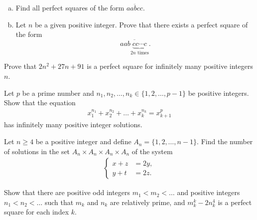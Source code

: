\documentclass[problems.tex]{subfile}
\begin{document}
	\begin{problem}
		$ $
		\begin{enumerate}[(a)]
			\item Find all perfect squares of the form $\overline{aabcc}$.
			\item Let $n$ be a given positive integer. Prove that there exists a perfect square of the form $$\overline{aab\underbrace{cc\cdots c}_{2n\text{ times}}}.$$
		\end{enumerate}
	\end{problem}



	\begin{problem}
		Prove that $2n^2 + 27n + 91$ is a perfect square for infinitely many positive integers $n$.
	\end{problem}


	\begin{problem}
		Let $p$ be a prime number and $n_1, n_2, \dots, n_k \in \{1, 2, \dots, p -1\}$ be positive integers. Show that the equation
		\begin{align*}
			x_1^{n_1} + x_2^{n_2} + \dots + x_k^{n_k} = x_{k+1}^p
		\end{align*}
		has infinitely many positive integer solutions.
	\end{problem}


	\begin{problem}
		Let $n \geq 4$ be a positive integer and define $A_n = \{1, 2, \dots, n -1\}$. Find the number of solutions in the set $A_n \times  A_n \times A_n \times A_n$ of the system
		\begin{align*}
			\begin{cases}
				x+z &= 2y,\\
				y+t &= 2z.
			\end{cases}
		\end{align*}
	\end{problem}



	\begin{problem}
		Show that there are positive odd integers $m_1 < m_2 < \dots  $ and positive integers $n_1 < n_2 < \dots$ such that $m_k$ and $n_k$ are relatively prime, and $m_k^k - 2n_k^4$ is a perfect square for each index $k$.
	\end{problem}
\end{document}

